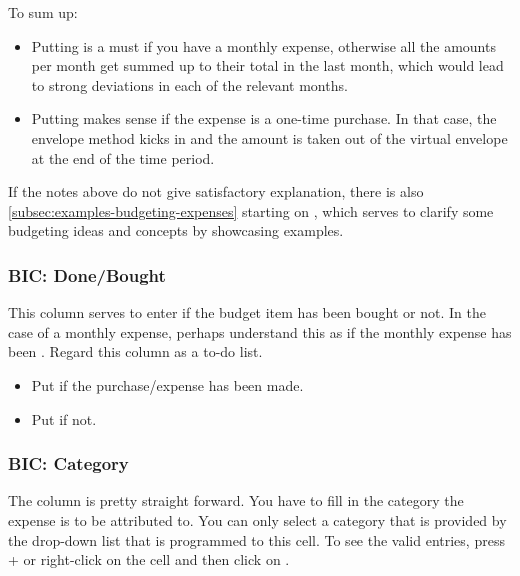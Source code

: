 To sum up:
\begin{itemize}
	\item Putting  is a must if you have a monthly expense, otherwise all the amounts per month get summed up to their total in the last month, which would lead to strong deviations in each of the relevant months.
	\item Putting  makes sense if the expense is a one-time purchase.
	In that case, the envelope method kicks in and the amount is taken out of the virtual envelope at the end of the time period.
\end{itemize}

If the notes above do not give satisfactory explanation, there is also \autoref{subsec:examples-budgeting-expenses} starting on , which serves to clarify some budgeting ideas and concepts by showcasing examples.

\subsubsection{BIC: Done/Bought}
\label{subsubsec:budgeting-item-column-done}

This column serves to enter if the budget item has been bought or not.
In the case of a monthly expense, perhaps understand this as if the monthly expense has been .
Regard this column as a to-do list.
\begin{itemize}
	\item Put  if the purchase/expense has been made.
	\item Put  if not.
\end{itemize}

\subsubsection{BIC: Category}
\label{subsubsec:budgeting-item-column-category}

The column  is pretty straight forward.
You have to fill in the category the expense is to be attributed to.
You can only select a category that is provided by the drop-down list that is programmed to this cell.
To see the valid entries, press +\keystroke{\( \downarrow \)} or right-click on the cell and then click on .